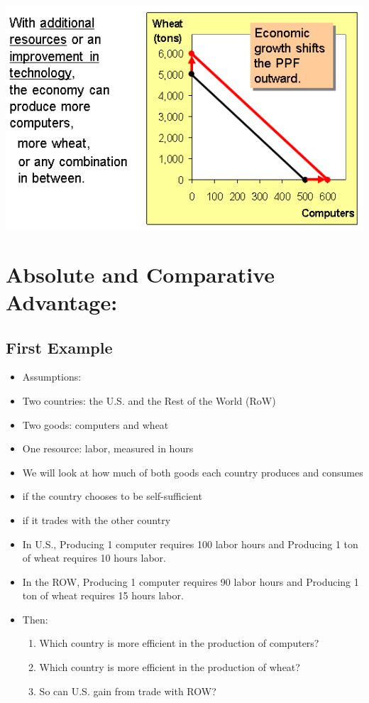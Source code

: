 \documentclass[
]{book}
\begin{document}
\includegraphics[width=\textwidth,height=0.5\textheight]{images/lesson02/page15.PNG}

\hypertarget{absolute-and-comparative-advantage}{%
\section{Absolute and Comparative Advantage:}\label{absolute-and-comparative-advantage}}

\hypertarget{first-example}{%
\subsection{First Example}\label{first-example}}

\begin{itemize}
\item
  Assumptions:
\item
  Two countries: the U.S. and the Rest of the World (RoW)
\item
  Two goods: computers and wheat
\item
  One resource: labor, measured in hours
\item
  We will look at how much of both goods each country produces and consumes
\item
  if the country chooses to be self-sufficient
\item
  if it trades with the other country
\item
  In U.S., Producing 1 computer requires 100 labor hours and
  Producing 1 ton of wheat requires 10 hours labor.
\item
  In the ROW, Producing 1 computer requires 90 labor hours and Producing 1 ton of wheat requires 15 hours labor.
\item
  Then:

  \begin{enumerate}
  \def\labelenumi{\alph{enumi}.}
  \item
    Which country is more efficient in the production of computers?
  \item
    Which country is more efficient in the production of wheat?
  \item
    So can U.S. gain from trade with ROW?
  \end{enumerate}
\end{itemize}
\end{document}
